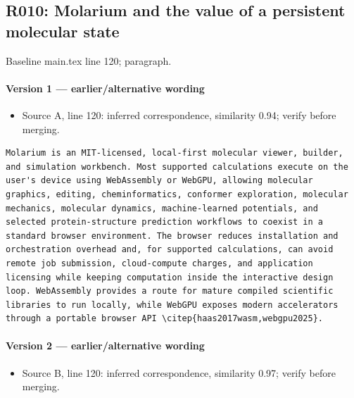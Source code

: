 \documentclass[11pt]{article}
\begin{document}
\subsection{R010: Molarium and the value of a persistent molecular state}

Baseline main.tex line 120; paragraph.

\paragraph{Version 1 --- earlier/alternative wording}

\begin{itemize}[leftmargin=*]
\item Source A, line 120: inferred correspondence, similarity 0.94; verify before merging.
\end{itemize}

\begin{lstlisting}
Molarium is an MIT-licensed, local-first molecular viewer, builder, and simulation workbench. Most supported calculations execute on the user's device using WebAssembly or WebGPU, allowing molecular graphics, editing, cheminformatics, conformer exploration, molecular mechanics, molecular dynamics, machine-learned potentials, and selected protein-structure prediction workflows to coexist in a standard browser environment. The browser reduces installation and orchestration overhead and, for supported calculations, can avoid remote job submission, cloud-compute charges, and application licensing while keeping computation inside the interactive design loop. WebAssembly provides a route for mature compiled scientific libraries to run locally, while WebGPU exposes modern accelerators through a portable browser API \citep{haas2017wasm,webgpu2025}.
\end{lstlisting}

\paragraph{Version 2 --- earlier/alternative wording}

\begin{itemize}[leftmargin=*]
\item Source B, line 120: inferred correspondence, similarity 0.97; verify before merging.
\end{itemize}
\end{document}
